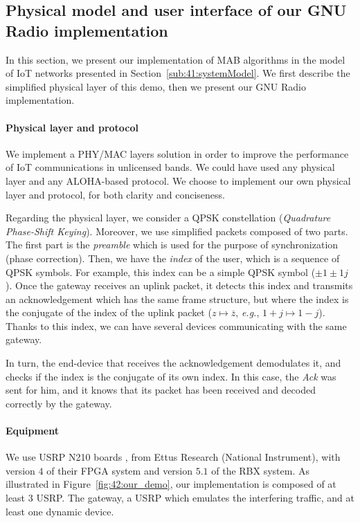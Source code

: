 \subsection{Physical model and user interface of our GNU Radio implementation}
\label{sub:42:implementation}

In this section, we present our implementation of MAB algorithms in the model of IoT networks presented in Section~\ref{sub:41:systemModel}.
We first describe the simplified physical layer of this demo, then we present our GNU Radio implementation.


\paragraph{Physical layer and protocol}

We implement a PHY/MAC layers solution in order to improve the performance of IoT communications in unlicensed bands. We could have used any physical layer and any ALOHA-based protocol.
We choose to implement our own physical layer and protocol, for both clarity and conciseness.

Regarding the physical layer, we consider a QPSK constellation (\emph{Quadrature Phase-Shift Keying}). Moreover, we use simplified packets composed of two parts.
The first part is the \emph{preamble} which is used for the purpose of synchronization (phase correction).
Then, we have the \emph{index} of the user, which is a sequence of QPSK symbols.
For example, this index can be a simple QPSK symbol ($\pm1\pm1j$).
Once the gateway receives an uplink packet, it detects this index and transmits an acknowledgement which has the same frame structure, but where the index is the conjugate of the index of the uplink packet ($z \mapsto \overline{z}$, \emph{e.g.}, $1+j \mapsto 1-j$).
Thanks to this index, we can have several devices communicating with the same gateway.

In turn, the end-device that receives the acknowledgement demodulates it, and checks if the index is the conjugate of its own index.
In this case, the \emph{Ack} was sent for him, and it knows that its packet has been received and decoded correctly by the gateway.


\paragraph{Equipment}
We use USRP N210 boards \cite{USRPDocumentation}, from Ettus Research (National Instrument),
with version $4$ of their FPGA system and version $5.1$ of the RBX system.
As illustrated in Figure~\ref{fig:42:our_demo}, our implementation is composed of at least $3$ USRP.
The gateway, a USRP which emulates the interfering traffic, and at least one dynamic device.

